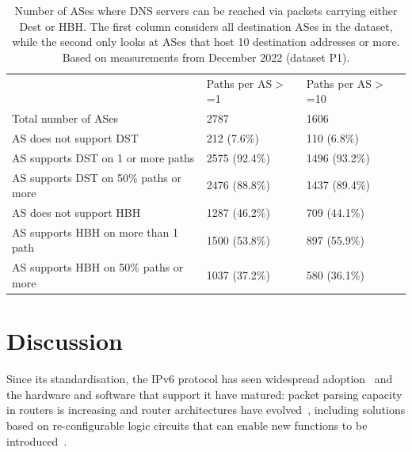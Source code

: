 \documentclass[conference]{IEEEtran}
\begin{document}
    \begin{table}
\begin{tabular}{p{}|p{}p{}}
                                          & Paths per AS$>$=1 & Paths per AS$>$=10 \\ \cline{1-3} 
Total number of ASes                      & 2787                                            & 1606                                            \\ \hline
AS does not support DST               & 212 (7.6\%)                                     & 110 (6.8\%)                                     \\
AS supports DST on 1 or more paths   & 2575 (92.4\%)                                   & 1496 (93.2\%)                                   \\
AS supports DST on 50\% paths or more & 2476  (88.8\%)                                  & 1437 (89.4\%)                                   \\ \hline
AS does not support HBH               & 1287 (46.2\%)                                   & 709 (44.1\%)                                    \\
AS supports HBH on more than 1 path   & 1500 (53.8\%)                                   & 897 (55.9\%)                                    \\
AS supports HBH on 50\% paths or more & 1037 (37.2\%)                                   & 580 (36.1\%)                                   
\end{tabular}
\label{tbl:as_pathspider}
\caption{Number of ASes where DNS servers can be reached via packets carrying either Dest or HBH. The first column considers all destination ASes in the dataset, while the second only looks at ASes that host 10 destination addresses or more. Based on measurements from December 2022 (dataset P1).}
\end{table}

\section{Discussion} 
\label{sec:discussion}

Since its standardisation, the IPv6 protocol has
seen widespread adoption~\cite{v6adoption_ton} and the hardware and software that
support it have matured: packet parsing capacity in routers is increasing and
router architectures have evolved~\cite{metamorphosis, p4}, including solutions based on re-configurable
logic circuits that can enable new functions to be introduced~\cite{cisco-silicon-one}.
\end{document}

